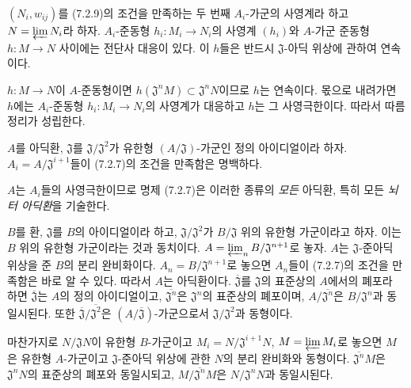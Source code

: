 \begin{corollary}[7.2.10]
\label{0.7.2.10-ko}
$(N_i,w_{ij})$를 (7.2.9)의 조건을 만족하는 두 번째
$A_i$-가군의 사영계라 하고 $N=\varprojlim N_i$라 하자.
$A_i$-준동형 $h_i:M_i\to N_i$의 사영계 $(h_i)$와
$A$-가군 준동형 $h:M\to N$ 사이에는 전단사 대응이 있다. 이
$h$들은 반드시 $\mathfrak J$-아딕 위상에 관하여 연속이다.
\end{corollary}

$h:M\to N$이 $A$-준동형이면
$h(\mathfrak J^nM)\subset\mathfrak J^nN$이므로 $h$는 연속이다.
몫으로 내려가면 $h$에는 $A_i$-준동형 $h_i:M_i\to N_i$의 사영계가
대응하고 $h$는 그 사영극한이다. 따라서 따름정리가 성립한다.

\begin{remark}[7.2.11]
\label{0.7.2.11-ko}
$A$를 아딕환, $\mathfrak J$를
$\mathfrak J/\mathfrak J^2$가 유한형
$(A/\mathfrak J)$-가군인 정의 아이디얼이라 하자.
$A_i=A/\mathfrak J^{i+1}$들이 (7.2.7)의 조건을 만족함은 명백하다.


$A$는 $A_i$들의 사영극한이므로 명제 (7.2.7)은 이러한 종류의
\emph{모든} 아딕환, 특히 모든 \emph{뇌터 아딕환}을 기술한다.
\end{remark}

\begin{example}[7.2.12]
\label{0.7.2.12-ko}
$B$를 환, $\mathfrak J$를 $B$의 아이디얼이라 하고,
$\mathfrak J/\mathfrak J^2$가 $B/\mathfrak J$ 위의 유한형
가군이라고 하자. 이는 $B$ 위의 유한형 가군이라는 것과 동치이다.
$A=\varprojlim_n B/\mathfrak J^{n+1}$로 놓자. $A$는
$\mathfrak J$-준아딕 위상을 준 $B$의 분리 완비화이다.
$A_n=B/\mathfrak J^{n+1}$로 놓으면 $A_n$들이 (7.2.7)의 조건을
만족함은 바로 알 수 있다. 따라서 $A$는 아딕환이다.
$\overline{\mathfrak J}$를 $\mathfrak J$의 표준상의 $A$에서의
폐포라 하면 $\overline{\mathfrak J}$는 $A$의 정의 아이디얼이고,
$\overline{\mathfrak J^n}$은 $\mathfrak J^n$의 표준상의 폐포이며,
$A/\overline{\mathfrak J^n}$은 $B/\mathfrak J^n$과 동일시된다.
또한 $\overline{\mathfrak J}/\overline{\mathfrak J^2}$은
$(A/\overline{\mathfrak J})$-가군으로서
$\mathfrak J/\mathfrak J^2$과 동형이다.

마찬가지로 $N/\mathfrak JN$이 유한형 $B$-가군이고
$M_i=N/\mathfrak J^{i+1}N$, $M=\varprojlim M_i$로 놓으면 $M$은
유한형 $A$-가군이고 $\mathfrak J$-준아딕 위상에 관한 $N$의 분리
완비화와 동형이다. $\overline{\mathfrak J^n}M$은
$\mathfrak J^nN$의 표준상의 폐포와 동일시되고,
$M/\overline{\mathfrak J^n}M$은 $N/\mathfrak J^nN$과
동일시된다.
\end{example}

